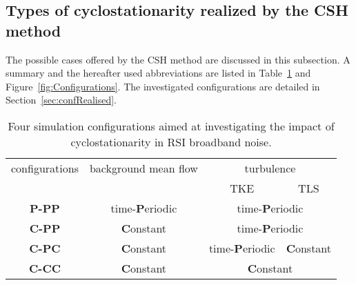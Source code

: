 \subsection{Types of cyclostationarity realized by the CSH method}\label{sec:config}
The possible cases offered by the CSH method are discussed in this subsection. A summary and the hereafter used abbreviations are listed in Table~\ref{Tab:Configurations} and Figure~\ref{fig:Configurations}. The investigated configurations are detailed in Section~\ref{sec:confRealised}.

\begin{table}[h]
\caption{Four simulation configurations aimed at investigating the impact of cyclostationarity in RSI broadband noise.
\label{Tab:Configurations} }
\begin{center}
\begin{tabular}{|c|c|c|c|}
\hline
configurations & background mean flow      & \multicolumn{2}{c|}{turbulence}   \\
\cline{3-4}
               &                & TKE           & TLS      \\
\hline
\hline
{\bf P-PP}            & time-{\bf P}eriodic  & \multicolumn{2}{c|}{time-{\bf P}eriodic}  \\
\hline
{\bf C-PP}            & {\bf C}onstant       & \multicolumn{2}{c|}{time-{\bf P}eriodic}  \\
\hline
{\bf C-PC}           & {\bf C}onstant        & time-{\bf P}eriodic & {\bf C}onstant             \\
\hline
{\bf C-CC}            & {\bf C}onstant       &  \multicolumn{2}{c|}{{\bf C}onstant}   \\
\hline
\end{tabular}
\end{center}
\end{table}

